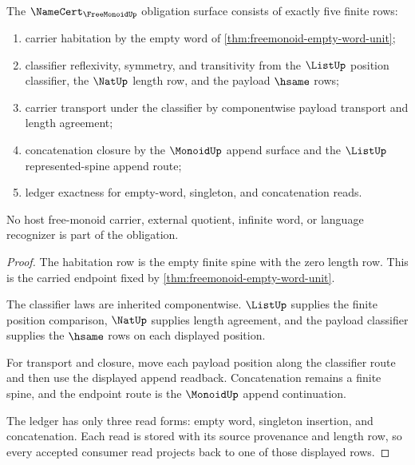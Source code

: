 \begin{theorem}
\label{thm:freemonoid-namecert-obligation-surface}
The $\NameCert_{\FreeMonoidUp}$ obligation surface consists of exactly five
finite rows:
\begin{enumerate}
\item carrier habitation by the empty word of
\autoref{thm:freemonoid-empty-word-unit};
\item classifier reflexivity, symmetry, and transitivity from the $\ListUp$
position classifier, the $\NatUp$ length row, and the payload $\hsame$ rows;
\item carrier transport under the classifier by componentwise payload transport
and length agreement;
\item concatenation closure by the $\MonoidUp$ append surface and the
$\ListUp$ represented-spine append route;
\item ledger exactness for empty-word, singleton, and concatenation reads.
\end{enumerate}
No host free-monoid carrier, external quotient, infinite word, or language
recognizer is part of the obligation.
\end{theorem}
\begin{proof}
The habitation row is the empty finite spine with the zero length row. This is
the carried endpoint fixed by \autoref{thm:freemonoid-empty-word-unit}.

The classifier laws are inherited componentwise. $\ListUp$ supplies the finite
position comparison, $\NatUp$ supplies length agreement, and the payload
classifier supplies the $\hsame$ rows on each displayed position.

For transport and closure, move each payload position along the classifier
route and then use the displayed append readback. Concatenation remains a finite
spine, and the endpoint route is the $\MonoidUp$ append continuation.

The ledger has only three read forms: empty word, singleton insertion, and
concatenation. Each read is stored with its source provenance and length row, so
every accepted consumer read projects back to one of those displayed rows.
\end{proof}

